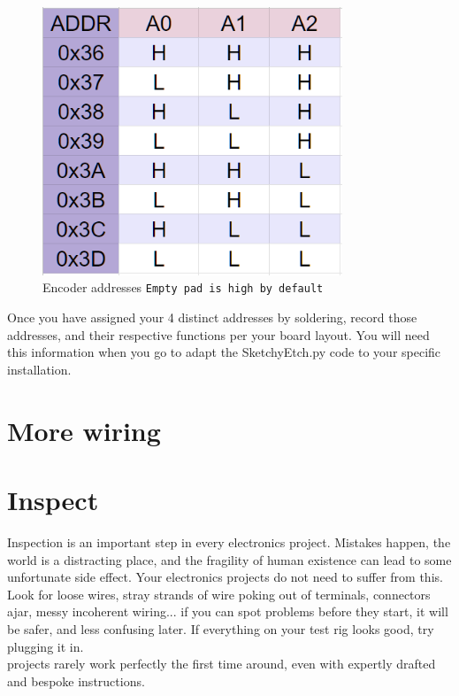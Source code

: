 \documentclass[]{article}
\begin{document}
\begin{figure}[ht]
	\centering
	\includegraphics[width=0.8\textwidth]{rotaryEncTable.png}
	\caption{Encoder addresses \texttt{Empty pad is high by default} }
	\label{fig:address asignments}
	\end{figure}

Once you have assigned your 4 distinct addresses by soldering, record those addresses, and their respective functions per your board layout. You will need this information when you go to adapt the SketchyEtch.py code to your specific installation.

\section*{More wiring}



\section*{Inspect}
Inspection is an important step in every electronics project. Mistakes happen, the world is a distracting place, and the fragility of human existence can lead to some unfortunate side effect. Your electronics projects do not need to suffer from this. Look for loose wires, stray strands of wire poking out of terminals, connectors ajar,  messy incoherent wiring... if you can spot problems before they start, it will be safer, and less confusing later. If everything on your test rig looks good, try plugging it in.\\ projects rarely work perfectly the first time around, even with expertly drafted and bespoke instructions. 
\end{document}
